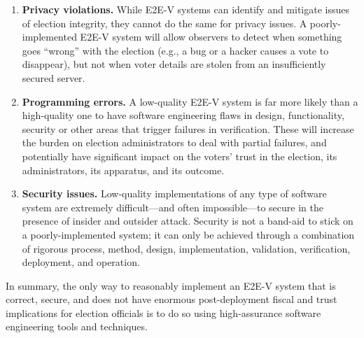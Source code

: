\begin{enumerate}
\item \textbf{Privacy violations.} While E2E-V systems can identify
  and mitigate issues of election integrity, they cannot do the same
  for privacy issues. A poorly-implemented E2E-V system will allow
  observers to detect when something goes ``wrong'' with the election
  (e.g., a bug or a hacker causes a vote to disappear), but not when
  voter details are stolen from an insufficiently secured server.
\item \textbf{Programming errors.} A low-quality E2E-V system is far
  more likely than a high-quality one to have software engineering
  flaws in design, functionality, security or other areas that trigger
  failures in verification. These will increase the burden on election
  administrators to deal with partial failures, and potentially have
  significant impact on the voters' trust in the election, its
  administrators, its apparatus, and its outcome.
\item \textbf{Security issues.} Low-quality implementations of any
  type of software system are extremely difficult---and often
  impossible---to secure in the presence of insider and outsider
  attack. Security is not a band-aid to stick on a poorly-implemented
  system; it can only be achieved through a combination of rigorous
  process, method, design, implementation, validation, verification,
  deployment, and operation.
\end{enumerate}

In summary, the only way to reasonably implement an E2E-V system that
is correct, secure, and does not have enormous post-deployment fiscal
and trust implications for election officials is to do so using
high-assurance software engineering tools and techniques.

